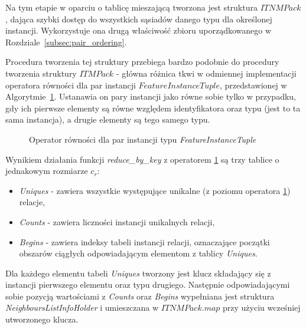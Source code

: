 \documentclass[12pt]{article}
\begin{document}
Na tym etapie w oparciu o tablicę mieszającą \cite{hashmap} tworzona jest struktura \linebreak $ ITNMPack $, dająca szybki dostęp do wszystkich sąsiadów danego typu dla określonej instancji. Wykorzystuje ona drugą właściwość zbioru uporządkowanego w Rozdziale~\ref{subsec:pair_ordering}.

Procedura tworzenia tej struktury przebiega bardzo podobnie do procedury tworzenia struktury $ ITMPack $ - główna różnica tkwi w odmiennej implementacji operatora równości dla par instancji $ FeatureInstanceTuple $, przedstawionej w Algorytmie~\ref{alg:FeatureInstanceTuple_operatorITNMPack}. Ustanawia on pary instancji jako równe sobie tylko w przypadku, gdy ich pierwsze elementy są równe względem identyfikatora oraz typu (jest to ta sama instancja), a drugie elementy są tego samego typu.

\begin{figure}[H]
\begin{algorithm}[H]
\caption{Operator równości dla par instancji typu \textit{FeatureInstanceTuple}}
\label{alg:FeatureInstanceTuple_operatorITNMPack}
\end{algorithm}
\end{figure}

Wynikiem działania funkcji \textit{reduce\_by\_key} z operatorem \ref{alg:FeatureInstanceTuple_operatorITNMPack} są trzy tablice o jednakowym rozmiarze $ c_{r} $:
\begin{itemize}
\item \textit{Uniques} - zawiera wszystkie występujące unikalne (z poziomu operatora \ref{alg:FeatureInstanceTuple_operatorITNMPack}) relacje,
\item \textit{Counts} - zawiera liczności instancji unikalnych relacji,
\item \textit{Begins} - zawiera indeksy tabeli instancji relacji, oznaczające początki obszarów ciągłych odpowiadającym elementom z tablicy \textit{Uniques}.
\end{itemize}

Dla każdego elementu tabeli \textit{Uniques} tworzony jest klucz składający się z instancji pierwszego elementu oraz typu drugiego. Następnie odpowiadającymi sobie pozycją wartościami z \textit{Counts} oraz \textit{Begins} wypełniana jest struktura \textit{NeighboursListInfoHolder} i umieszczana w $ ITNMPack.map $ przy użyciu wcześniej utworzonego klucza. 
\end{document}
